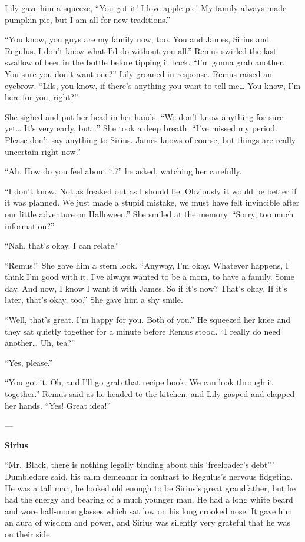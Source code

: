 \documentclass[12pt,twoside,openright]{memoir}
\begin{document}
Lily gave him a squeeze, ``You got it! I love apple pie! My family always made pumpkin pie, but I am all for new traditions.''

``You know, you guys are my family now, too. You and James, Sirius and Regulus. I don't know what I'd do without you all.'' Remus swirled the last swallow of beer in the bottle before tipping it back. ``I'm gonna grab another. You sure you don't want one?'' Lily groaned in response. Remus raised an eyebrow. ``Lils, you know, if there's anything you want to tell me… You know, I'm here for you, right?''

She sighed and put her head in her hands. ``We don't know anything for sure yet… It's very early, but…'' She took a deep breath. ``I've missed my period. Please don't say anything to Sirius. James knows of course, but things are really uncertain right now.''

``Ah. How do you feel about it?'' he asked, watching her carefully. 

``I don't know. Not as freaked out as I should be. Obviously it would be better if it was planned. We just made a stupid mistake, we must have felt invincible after our little adventure on Halloween.'' She smiled at the memory. ``Sorry, too much information?''

``Nah, that's okay. I can relate.'' 

``Remus!'' She gave him a stern look. ``Anyway, I'm okay. Whatever happens, I think I'm good with it. I've always wanted to be a mom, to have a family. Some day. And now, I know I want it with James. So if it's now? That's okay. If it's later, that's okay, too.'' She gave him a shy smile.

``Well, that's great. I'm happy for you. Both of you.'' He squeezed her knee and they sat quietly together for a minute before Remus stood. ``I really do need another… Uh, tea?''

``Yes, please.'' 

``You got it. Oh, and I'll go grab that recipe book. We can look through it together.'' Remus said as he headed to the kitchen, and Lily gasped and clapped her hands. ``Yes! Great idea!''

---

\textbf{Sirius} 

``Mr.\ Black, there is nothing legally binding about this ‘freeloader's debt''' Dumbledore said, his calm demeanor in contrast to Regulus's nervous fidgeting. He was a tall man, he looked old enough to be Sirius's great grandfather, but he had the energy and bearing of a much younger man. He had a long white beard and wore half-moon glasses which sat low on his long crooked nose. It gave him an aura of wisdom and power, and Sirius was silently very grateful that he was on their side.
\end{document}
